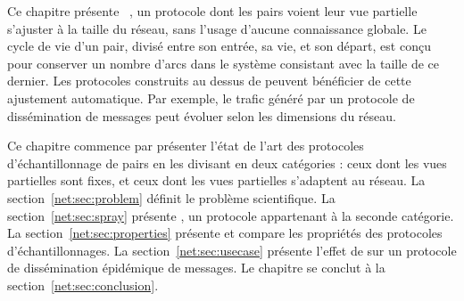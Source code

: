 


Ce chapitre présente \SPRAY~\cite{nedelec2015spray}, un protocole dont les pairs
voient leur vue partielle s'ajuster à la taille du réseau, sans l'usage d'aucune
connaissance globale. Le cycle de vie d'un pair, divisé entre son entrée, sa
vie, et son départ, est conçu pour conserver un nombre d'arcs dans le système
consistant avec la taille de ce dernier. Les protocoles construits au dessus de
\SPRAY peuvent bénéficier de cette ajustement automatique. Par exemple, le trafic
généré par un protocole de dissémination de messages peut évoluer selon les
dimensions du réseau.

Ce chapitre commence par présenter l'état de l'art des protocoles
d'échantillonnage de pairs en les divisant en deux catégories : ceux dont les
vues partielles sont fixes, et ceux dont les vues partielles s'adaptent au
réseau. La section~\ref{net:sec:problem} définit le problème scientifique.
La section~\ref{net:sec:spray} présente
\SPRAY, un protocole appartenant à la seconde catégorie. La
section~\ref{net:sec:properties} présente et compare les propriétés des
protocoles d'échantillonnages. La section~\ref{net:sec:usecase} présente l'effet
de \SPRAY sur un protocole de dissémination épidémique de messages. Le chapitre
se conclut à la section~\ref{net:sec:conclusion}.

